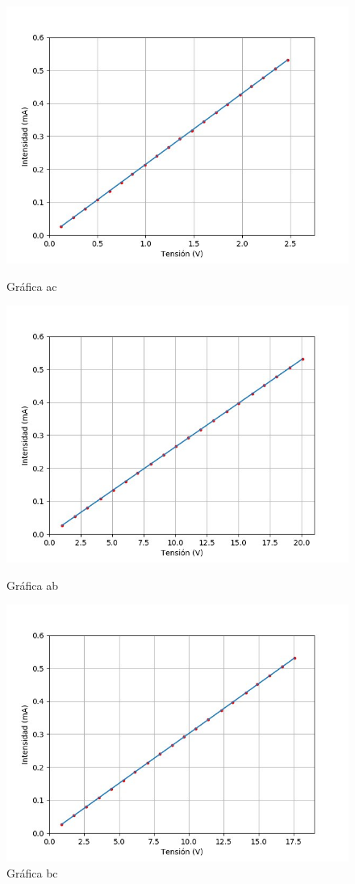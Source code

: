 \documentclass[a4paper,11pt]{article}
\begin{document}
\begin{figure}[hbtp]
\centering
\includegraphics[scale=0.5]{Imagenes/Grafica_ac.jpg}
\caption{Gráfica ac}
\includegraphics[scale=0.5]{Imagenes/Grafica_ab.jpg}
\caption{Gráfica ab}
\includegraphics[scale=0.5]{Imagenes/Grafica_bc.jpg}
\caption{Gráfica bc}
\end{figure}
\end{document}
